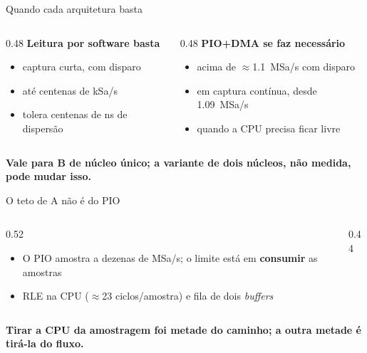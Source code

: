 \documentclass{UFAL-beamer-moderno}
\newcommand{\en}[1]{\textit{#1}}
\newcommand{\punch}[1]{%
  \begin{center}\color{ufalNavy}\large\bfseries #1\end{center}}
\begin{document}
\begin{frame}{Quando cada arquitetura basta}
  \begin{columns}[T]
    \begin{column}{0.48\textwidth}
      \textcolor{fwB}{\textbf{Leitura por software basta}}
      \begin{itemize}
        \setlength{\itemsep}{6pt}
        \item captura curta, com disparo
        \item até centenas de kSa/s
        \item tolera centenas de ns de dispersão
      \end{itemize}
    \end{column}
    \begin{column}{0.48\textwidth}
      \textcolor{fwA}{\textbf{PIO+DMA se faz necessário}}
      \begin{itemize}
        \setlength{\itemsep}{6pt}
        \item acima de $\approx$\SI{1.1}{MSa/s} com disparo
        \item em captura contínua, desde \SI{1.09}{MSa/s}
        \item quando a CPU precisa ficar livre
      \end{itemize}
    \end{column}
  \end{columns}
  \vspace{10pt}
  \punch{\normalsize Vale para B de núcleo único; a variante de dois núcleos,
    não medida, pode mudar isso.}
\end{frame}

\begin{frame}{O teto de A não é do PIO}
  \begin{columns}[T]
    \begin{column}{0.52\textwidth}
      \begin{itemize}
        \setlength{\itemsep}{8pt}
        \item O PIO amostra a dezenas de MSa/s; o limite está em \textbf{consumir}
              as amostras
        \item RLE na CPU ($\approx$23 ciclos/amostra) e fila de dois
              \en{buffers}
      \end{itemize}
    \end{column}
    \begin{column}{0.44\textwidth}
    \end{column}
  \end{columns}
  \vspace{8pt}
  \punch{\normalsize Tirar a CPU da amostragem foi metade do caminho;
    a outra metade é tirá-la do fluxo.}
\end{frame}
\end{document}
